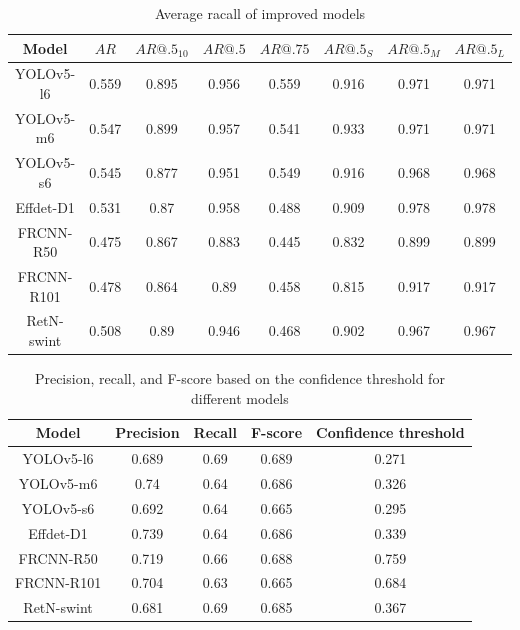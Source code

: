 \begin{table}[H]
    \centering
    \begin{tabular}{|c|c|c|c|c|c|c|c|}
        \hline
        Model      & $AR$  & $AR@.5_{10}$ & $AR@.5$ & $AR@.75$ & $AR@.5_S$ & $AR@.5_M$ & $AR@.5_L$ \\ \hline
        YOLOv5-l6  & 0.559 & 0.895        & 0.956   & 0.559    & 0.916     & 0.971     & 0.971     \\ \hline
        YOLOv5-m6  & 0.547 & 0.899        & 0.957   & 0.541    & 0.933     & 0.971     & 0.971     \\ \hline
        YOLOv5-s6  & 0.545 & 0.877        & 0.951   & 0.549    & 0.916     & 0.968     & 0.968     \\ \hline
        Effdet-D1  & 0.531 & 0.87         & 0.958   & 0.488    & 0.909     & 0.978     & 0.978     \\ \hline
        FRCNN-R50  & 0.475 & 0.867        & 0.883   & 0.445    & 0.832     & 0.899     & 0.899     \\ \hline
        FRCNN-R101 & 0.478 & 0.864        & 0.89    & 0.458    & 0.815     & 0.917     & 0.917     \\ \hline
        RetN-swint & 0.508 & 0.89         & 0.946   & 0.468    & 0.902     & 0.967     & 0.967     \\ \hline
    \end{tabular}
    \caption{Average racall of improved models}
    \label{tab:improved:recall}
\end{table}


\begin{table}[H]
    \begin{tabular}{|c|c|c|c|c|}
        \hline
        Model      & Precision & Recall & F-score & Confidence threshold \\ \hline
        YOLOv5-l6  & 0.689     & 0.69   & 0.689   & 0.271                \\ \hline
        YOLOv5-m6  & 0.74      & 0.64   & 0.686   & 0.326                \\ \hline
        YOLOv5-s6  & 0.692     & 0.64   & 0.665   & 0.295                \\ \hline
        Effdet-D1  & 0.739     & 0.64   & 0.686   & 0.339                \\ \hline
        FRCNN-R50  & 0.719     & 0.66   & 0.688   & 0.759                \\ \hline
        FRCNN-R101 & 0.704     & 0.63   & 0.665   & 0.684                \\ \hline
        RetN-swint & 0.681     & 0.69   & 0.685   & 0.367                \\ \hline
    \end{tabular}
    \caption{Precision, recall, and F-score based on the confidence threshold for different models}
    \label{tab:imrpoved:prf}
\end{table}

